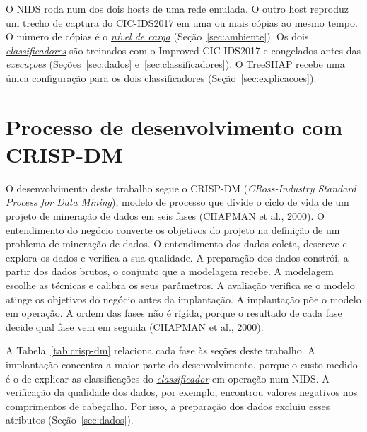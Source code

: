 \documentclass[
  12pt,
  oneside,
  a4paper,
  chapter=TITLE,
  sumario=tradicional,
  english,
  brazil
]{abntex2}
\newcommand{\termo}[2]{\hyperref[gl:#1]{\emph{#2}}}
\begin{document}
O NIDS roda num dos dois hosts de uma rede emulada. O outro host reproduz um trecho de captura do
CIC-IDS2017 em uma ou mais cópias ao mesmo tempo. O número de cópias é o
\termo{nivel-carga}{nível de carga} (Seção~\ref{sec:ambiente}). Os dois
\termo{classificador}{classificadores} são treinados com o Improved CIC-IDS2017 e congelados antes
das \termo{execucao}{execuções} (Seções~\ref{sec:dados} e~\ref{sec:classificadores}). O TreeSHAP
recebe uma única configuração para os dois classificadores (Seção~\ref{sec:explicacoes}).

\section{Processo de desenvolvimento com CRISP-DM}
\label{sec:crisp-dm}

O desenvolvimento deste trabalho segue o CRISP-DM (\emph{CRoss-Industry Standard Process for Data
Mining}), modelo de processo que divide o ciclo de vida de um projeto de mineração de dados em seis
fases (CHAPMAN et al., 2000). O entendimento do negócio converte os objetivos do projeto na
definição de um problema de mineração de dados. O entendimento dos dados coleta, descreve e explora
os dados e verifica a sua qualidade. A preparação dos dados constrói, a partir dos
dados brutos, o conjunto que a modelagem recebe. A modelagem escolhe as técnicas e calibra os seus
parâmetros. A avaliação verifica se o modelo atinge os objetivos do negócio antes da implantação. A
implantação põe o modelo em operação. A ordem das fases não é rígida, porque o resultado de cada
fase decide qual fase vem em seguida (CHAPMAN et al., 2000).

A Tabela~\ref{tab:crisp-dm} relaciona cada fase às seções deste trabalho. A implantação concentra a
maior parte do desenvolvimento, porque o custo medido é o de explicar as classificações do
\termo{classificador}{classificador} em operação num NIDS. A verificação da qualidade dos dados,
por exemplo, encontrou valores negativos nos comprimentos de cabeçalho. Por
isso, a preparação dos dados excluiu esses atributos (Seção~\ref{sec:dados}).
\end{document}
